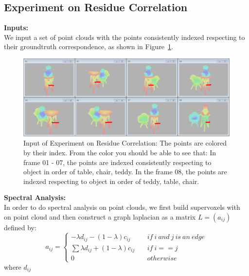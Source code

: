 \subsection{Experiment on Residue Correlation}
\label{subsec:exp:res}
\textbf{Inputs:}\\
We input a set of point clouds with the points consistently indexed respecting to their groundtruth correspondence, as shown in Figure~\ref{fig:input_for_exp_res}.\\
\begin{figure}
	\centering
	\includegraphics[width=\textwidth]{images/exp_res/inputs.png}
	\caption{Input of Experiment on Residue Correlation: The points are colored by their index. From the color you should be able to see that: In frame 01 - 07, the points are indexed consistently respecting to object in order of table, chair, teddy. In the frame 08, the points are indexed respecting to object in order of teddy, table, chair.}
	\label{fig:input_for_exp_res}
\end{figure}
\textbf{Spectral Analysis:}\\
In order to do spectral analysis on point clouds, we first build supervoxels with \cite{Supervoxels} on point cloud and then construct a graph laplacian as a matrix $L=(a_{ij})$ defined by:
$$ a_{ij}=\left\{
\begin{aligned}
-\lambda d_{ij}-(1-\lambda) c_{ij} &~&if~i~and~j~is~an~edge\\
\sum\lambda d_{ij}+(1-\lambda) c_{ij} &~&if~i==j\\
0 &~&otherwise
\end{aligned}
\right.
$$
where $d_{ij}$
